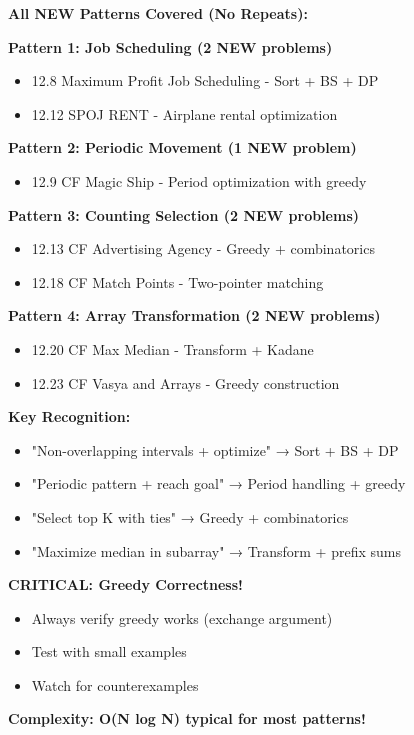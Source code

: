 \documentclass[11pt,a4paper,oneside]{book}
\begin{document}
\begin{tcolorbox}[
    enhanced,breakable,
    colback=primaryblue!10,
    colframe=primaryblue,
    boxrule=2pt,
    arc=4mm,
    title=\textbf{Binary Search with Greedy: Complete Mastery}
]
\textbf{All NEW Patterns Covered (No Repeats):}

\textbf{Pattern 1: Job Scheduling (2 NEW problems)}
\begin{itemize}
\item 12.8 Maximum Profit Job Scheduling - Sort + BS + DP
\item 12.12 SPOJ RENT - Airplane rental optimization
\end{itemize}

\textbf{Pattern 2: Periodic Movement (1 NEW problem)}
\begin{itemize}
\item 12.9 CF Magic Ship - Period optimization with greedy
\end{itemize}

\textbf{Pattern 3: Counting Selection (2 NEW problems)}
\begin{itemize}
\item 12.13 CF Advertising Agency - Greedy + combinatorics
\item 12.18 CF Match Points - Two-pointer matching
\end{itemize}

\textbf{Pattern 4: Array Transformation (2 NEW problems)}
\begin{itemize}
\item 12.20 CF Max Median - Transform + Kadane
\item 12.23 CF Vasya and Arrays - Greedy construction
\end{itemize}

\textbf{Key Recognition:}
\begin{itemize}
\item "Non-overlapping intervals + optimize" → Sort + BS + DP
\item "Periodic pattern + reach goal" → Period handling + greedy
\item "Select top K with ties" → Greedy + combinatorics
\item "Maximize median in subarray" → Transform + prefix sums
\end{itemize}

\textbf{CRITICAL: Greedy Correctness!}
\begin{itemize}
\item Always verify greedy works (exchange argument)
\item Test with small examples
\item Watch for counterexamples
\end{itemize}

\textbf{Complexity: O(N log N) typical for most patterns!}
\end{tcolorbox}
\end{document}
